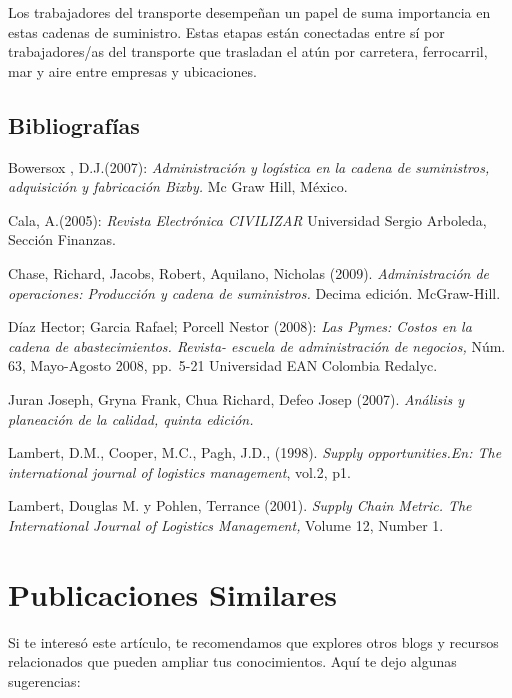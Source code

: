 \documentclass[
  jou,
  floatsintext,
  longtable,
  a4paper,
  nolmodern,
  notxfonts,
  notimes,
  colorlinks=true,linkcolor=blue,citecolor=blue,urlcolor=blue]{apa7}
\begin{document}
Los trabajadores del transporte desempeñan un papel de suma importancia
en estas cadenas de suministro. Estas etapas están conectadas entre sí
por trabajadores/as del transporte que trasladan el atún por carretera,
ferrocarril, mar y aire entre empresas y ubicaciones.

\subsection{Bibliografías}\label{bibliografuxedas}

Bowersox , D.J.(2007): \emph{Administración y logística en la cadena de
suministros, adquisición y fabricación Bixby.} Mc Graw Hill, México.

Cala, A.(2005): \emph{Revista Electrónica CIVILIZAR} Universidad Sergio
Arboleda, Sección Finanzas.

Chase, Richard, Jacobs, Robert, Aquilano, Nicholas (2009).
\emph{Administración de operaciones: Producción y cadena de
suministros.} Decima edición. McGraw-Hill.

Díaz Hector; Garcia Rafael; Porcell Nestor (2008): \emph{Las Pymes:
Costos en la cadena de abastecimientos. Revista- escuela de
administración de negocios,} Núm. 63, Mayo-Agosto 2008, pp.~5-21
Universidad EAN Colombia Redalyc.

Juran Joseph, Gryna Frank, Chua Richard, Defeo Josep (2007).
\emph{Análisis y planeación de la calidad, quinta edición.}

Lambert, D.M., Cooper, M.C., Pagh, J.D., (1998). \emph{Supply
opportunities.En: The international journal of logistics management},
vol.2, p1.

Lambert, Douglas M. y Pohlen, Terrance (2001). \emph{Supply Chain
Metric. The International Journal of Logistics Management,} Volume 12,
Number 1.

\section{Publicaciones Similares}\label{publicaciones-similares}

Si te interesó este artículo, te recomendamos que explores otros blogs y
recursos relacionados que pueden ampliar tus conocimientos. Aquí te dejo
algunas sugerencias:
\end{document}
